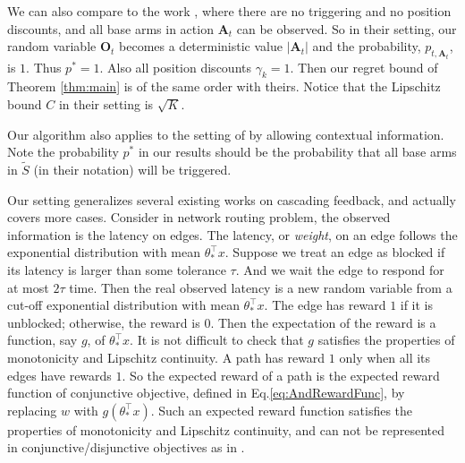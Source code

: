 \documentclass{article}
\newcommand{\bA}{\mathbf{A}}
\newcommand{\bO}{\mathbf{O}}
\begin{document}
We can also compare to the work \cite{qin2014contextual}, where there are no triggering and no position discounts, and all base arms in action $\bA_t$ can be observed. So in their setting, our random variable $\bO_t$ becomes a deterministic value $|\bA_t|$ and the probability, $p_{t, \bA_t}$, is $1$. Thus $p^{\ast} = 1$. Also all position discounts $\gamma_k = 1$. Then our regret bound of Theorem \ref{thm:main} is of the same order with theirs. Notice that the Lipschitz bound $C$ in their setting is $\sqrt{K}$.

Our algorithm also applies to the setting of \cite{chen2013combinatorial} by allowing contextual information. Note the probability $p^{\ast}$ in our results should be the probability that all base arms in $\tilde{S}$ (in their notation) will be triggered.

Our setting generalizes several existing works on cascading feedback, and actually covers more cases. Consider in network routing problem, the observed information is the latency on edges. The latency, or {\it weight}, on an edge follows the exponential distribution with mean $\theta_{\ast}^{\top}x$. Suppose we treat an edge as blocked if its latency is larger than some tolerance $\tau$. And we wait the edge to respond for at most $2\tau$ time. Then the real observed latency is a new random variable from a cut-off exponential distribution with mean $\theta_{\ast}^{\top}x$. The edge has reward $1$ if it is unblocked; otherwise, the reward is $0$. Then the expectation of the reward is a function, say $g$, of $\theta_{\ast}^{\top}x$. It is not difficult to check that $g$ satisfies the properties of monotonicity and Lipschitz continuity. A path has reward $1$ only when all its edges have rewards $1$. So the expected reward of a path is the expected reward function of conjunctive objective, defined in Eq.\eqref{eq:AndRewardFunc}, by replacing $w$ with $g(\theta_{\ast}^{\top}x)$. Such an expected reward function satisfies the properties of monotonicity and Lipschitz continuity, and can not be represented in conjunctive/disjunctive objectives as in \cite{kveton2015cascading,kveton2015combinatorial}.
\end{document}
